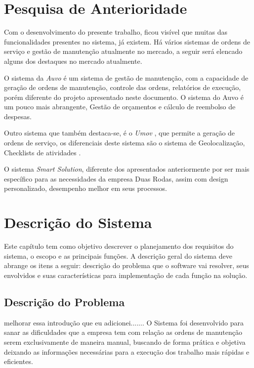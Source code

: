 \chapter{Pesquisa de Anterioridade}


Com o desenvolvimento do presente trabalho, ficou visível que muitas das funcionalidades presentes no sistema, já existem. Há vários sistemas de ordens de serviço e gestão de manutenção atualmente no mercado, a seguir será elencado alguns dos destaques no mercado atualmente.

O sistema da \textit{Auvo} é um sistema de gestão de manutenção, com a capacidade de geração de ordens de manutenção, controle das ordens, relatórios de execução, porém diferente do
projeto apresentado neste documento. O sistema do Auvo é um pouco mais abrangente,
Gestão de orçamentos e cálculo de reembolso de despesas.\cite{Auvo2019}

Outro sistema que também destaca-se, é o \textit{Umov} 
, que permite a geração de ordens de serviço,
os diferenciais deste sistema são o sistema de Geolocalização, Checklists de atividades \cite{umov2019}.

O sistema \textit{Smart Solution}, diferente dos apresentados anteriormente por ser mais específico para as
necessidades da empresa Duas Rodas, assim com design personalizado, desempenho melhor em seus processos.


\chapter{Descrição do Sistema }

Este capítulo tem como objetivo descrever o planejamento dos requisitos  do sistema, o escopo e as principais funções. A descrição geral do sistema deve abrange os itens a seguir: descrição do problema que o software vai resolver, seus envolvidos e suas características para implementação de cada função na solução.



\section{Descrição do Problema}
 {\color{red} melhorar essa introdução que eu adicionei.......
 O  Sistema foi desenvolvido para sanar as dificuldades que a empresa tem com relação as ordens de manutenção serem exclusivamente de maneira manual, buscando de forma prática e objetiva deixando as informações necessárias para a execução dos trabalho mais rápidas e eficientes.}

